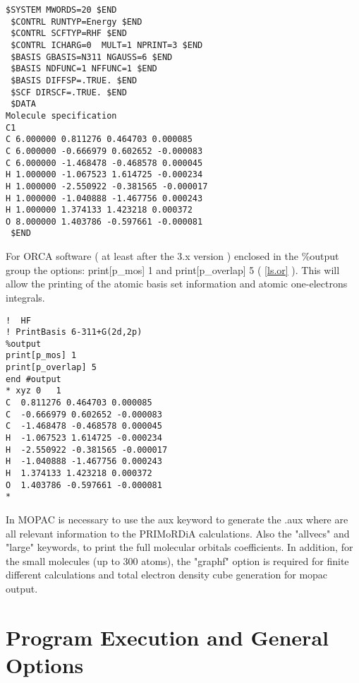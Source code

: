\documentclass[a4paper,11pt]{refart}
\begin{document}
\begin{minipage}{\textwidth}
\begin{lstlisting}[caption={Gamess Input Example},label={ls.gam}]
 $SYSTEM MWORDS=20 $END
 $CONTRL RUNTYP=Energy $END
 $CONTRL SCFTYP=RHF $END
 $CONTRL ICHARG=0  MULT=1 NPRINT=3 $END
 $BASIS GBASIS=N311 NGAUSS=6 $END
 $BASIS NDFUNC=1 NFFUNC=1 $END
 $BASIS DIFFSP=.TRUE. $END
 $SCF DIRSCF=.TRUE. $END
 $DATA
Molecule specification
C1
C 6.000000 0.811276 0.464703 0.000085
C 6.000000 -0.666979 0.602652 -0.000083
C 6.000000 -1.468478 -0.468578 0.000045
H 1.000000 -1.067523 1.614725 -0.000234
H 1.000000 -2.550922 -0.381565 -0.000017
H 1.000000 -1.040888 -1.467756 0.000243
H 1.000000 1.374133 1.423218 0.000372
O 8.000000 1.403786 -0.597661 -0.000081
 $END
\end{lstlisting}
\end{minipage}

For ORCA software ( at least after the 3.x version ) enclosed in the \%output group the options: print[p\_mos] 1 and print[p\_overlap] 5 ( \autoref{ls.or} ). This will allow the printing of the atomic basis set information and atomic one-electrons integrals.

\begin{minipage}{\textwidth}
\begin{lstlisting}[caption={ORCA Input Example},label={ls.or}]
!  HF 
! PrintBasis 6-311+G(2d,2p)
%output
print[p_mos] 1
print[p_overlap] 5 
end #output
* xyz 0   1
C  0.811276 0.464703 0.000085
C  -0.666979 0.602652 -0.000083
C  -1.468478 -0.468578 0.000045
H  -1.067523 1.614725 -0.000234
H  -2.550922 -0.381565 -0.000017
H  -1.040888 -1.467756 0.000243
H  1.374133 1.423218 0.000372
O  1.403786 -0.597661 -0.000081
*
\end{lstlisting}
\end{minipage}

In MOPAC is necessary to use the aux keyword to generate the .aux where are all  relevant information to the PRIMoRDiA calculations. Also the "allvecs" and "large" keywords, to print the full molecular orbitals coefficients.  In addition, for the small molecules (up to 300 atoms), the "graphf" option is required for finite different calculations and total electron density cube generation for mopac output. 

\section{Program Execution and General Options}
\end{document}
